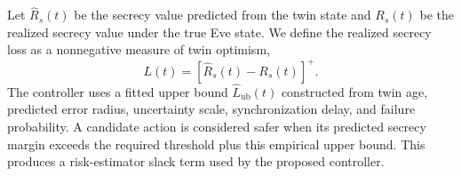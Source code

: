 Let $\widehat{R}_s(t)$ be the secrecy value predicted from the twin state and $R_s(t)$ be the realized secrecy value under the true Eve state. We define the realized secrecy loss as a nonnegative measure of twin optimism,
\begin{equation}
    L(t)=\left[\widehat{R}_s(t)-R_s(t)\right]^+.
\end{equation}
The controller uses a fitted upper bound $\widehat{L}_{\mathrm{ub}}(t)$ constructed from twin age, predicted error radius, uncertainty scale, synchronization delay, and failure probability. A candidate action is considered safer when its predicted secrecy margin exceeds the required threshold plus this empirical upper bound. This produces a risk-estimator slack term used by the proposed controller.
